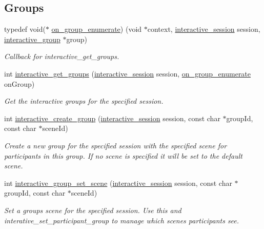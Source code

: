 \subsection*{Groups}
\begin{DoxyCompactItemize}
\item 
typedef void($\ast$ \mbox{\hyperlink{group___interactivity_ga94f3f5e9c3f20ed45e333767263adbc2}{on\+\_\+group\+\_\+enumerate}}) (void $\ast$context, \mbox{\hyperlink{group___interactivity_ga6d8819d38b8dc8994a2299cf22a65a31}{interactive\+\_\+session}} session, \mbox{\hyperlink{structinteractive__group}{interactive\+\_\+group}} $\ast$group)
\begin{DoxyCompactList}\small\item\em Callback for {\ttfamily interactive\+\_\+get\+\_\+groups}. \end{DoxyCompactList}\item 
int \mbox{\hyperlink{group___interactivity_gac48f6aafcb999fa604314fcb494c14cc}{interactive\+\_\+get\+\_\+groups}} (\mbox{\hyperlink{group___interactivity_ga6d8819d38b8dc8994a2299cf22a65a31}{interactive\+\_\+session}} session, \mbox{\hyperlink{group___interactivity_ga94f3f5e9c3f20ed45e333767263adbc2}{on\+\_\+group\+\_\+enumerate}} on\+Group)
\begin{DoxyCompactList}\small\item\em Get the interactive groups for the specified session. \end{DoxyCompactList}\item 
int \mbox{\hyperlink{group___interactivity_ga733784dd287b3fefa0882234f76f0d82}{interactive\+\_\+create\+\_\+group}} (\mbox{\hyperlink{group___interactivity_ga6d8819d38b8dc8994a2299cf22a65a31}{interactive\+\_\+session}} session, const char $\ast$group\+Id, const char $\ast$scene\+Id)
\begin{DoxyCompactList}\small\item\em Create a new group for the specified session with the specified scene for participants in this group. If no scene is specified it will be set to the default scene. \end{DoxyCompactList}\item 
int \mbox{\hyperlink{group___interactivity_gadc0bc428c8fc8027353f9936fb018a57}{interactive\+\_\+group\+\_\+set\+\_\+scene}} (\mbox{\hyperlink{group___interactivity_ga6d8819d38b8dc8994a2299cf22a65a31}{interactive\+\_\+session}} session, const char $\ast$group\+Id, const char $\ast$scene\+Id)
\begin{DoxyCompactList}\small\item\em Set a group\textquotesingle{}s scene for the specified session. Use this and {\ttfamily interative\+\_\+set\+\_\+participant\+\_\+group} to manage which scenes participants see. \end{DoxyCompactList}\end{DoxyCompactItemize}
